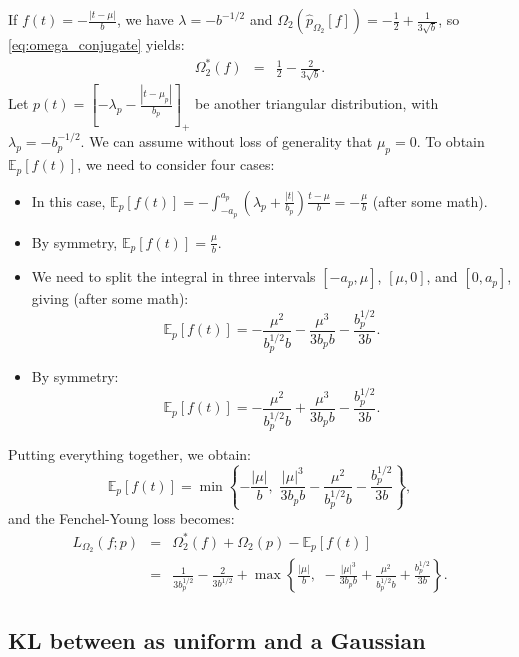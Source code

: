 \documentclass{article}
\begin{document}
{If $f(t) = -\frac{|t-\mu|}{b}$,
we have $\lambda=-b^{-1/2}$
and $\Omega_2(\hat{p}_{\Omega_2}[f]) = -\frac{1}{2} +  \frac{1}{3\sqrt{b}}$, so \eqref{eq:omega_conjugate} yields:
\begin{eqnarray}
\Omega_2^*(f) &=& \frac{1}{2} -\frac{2}{3\sqrt{b}}.
\end{eqnarray}
Let
$p(t) = [-\lambda_p - \frac{|t-\mu_p|}{b_p}]_+$ be another triangular distribution,
with $\lambda_p = -b_p^{-1/2}$.
We can assume without loss of generality that $\mu_p=0$.
To obtain $\mathbb{E}_p[f(t)]$, we need to consider four cases:
\begin{itemize}
\item {}
In this case, $\mathbb{E}_p[f(t)] = -\int_{-a_p}^{a_p} \left(\lambda_p  + \frac{|t|}{b_p} \right) \frac{t-\mu}{b} = -\frac{\mu}{b}$ (after some math).
\item {}
By symmetry, $\mathbb{E}_p[f(t)] = \frac{\mu}{b}$.
\item {}
We need to split the integral in three intervals $[-a_p, \mu]$, $[\mu, 0]$, and $[0, a_p]$, giving (after some math):
\begin{equation}
\mathbb{E}_p[f(t)] = -\frac{\mu^2}{b_p^{1/2} b} - \frac{\mu^3}{3 b_p b} - \frac{b_p^{1/2}}{3b}.
\end{equation}
\item {}
By symmetry:
\begin{equation}
\mathbb{E}_p[f(t)] = -\frac{\mu^2}{b_p^{1/2} b} + \frac{\mu^3}{3 b_p b} - \frac{b_p^{1/2}}{3b}.
\end{equation}
\end{itemize}
Putting everything together, we obtain:
\begin{equation}
\mathbb{E}_p[f(t)] = \min \left\{-\frac{|\mu|}{b}, \,\, \frac{|\mu|^3}{3 b_p b} -\frac{\mu^2}{b_p^{1/2} b} - \frac{b_p^{1/2}}{3b}\right\},
\end{equation}
and
the Fenchel-Young loss becomes:
\begin{eqnarray}
L_{\Omega_2}(f; p) &=&
\Omega_2^*(f) + \Omega_2(p) - \mathbb{E}_p[f(t)]\nonumber\\
&=&
\frac{1}{3b_p^{1/2}} - \frac{2}{3b^{1/2}}
+ \max \left\{\frac{|\mu|}{b}, \,\, -\frac{|\mu|^3}{3 b_p b} +\frac{\mu^2}{b_p^{1/2} b} + \frac{b_p^{1/2}}{3b}\right\}.
\end{eqnarray}






\subsection{KL  between as uniform and a Gaussian}

}
\end{document}
